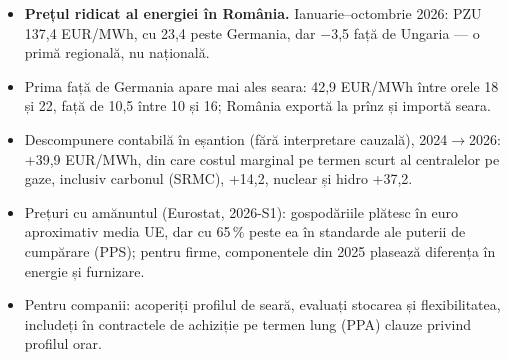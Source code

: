 \begin{itemize}\setlength{\itemsep}{2pt}
  \item \textbf{Prețul ridicat al energiei în România.} Ianuarie--octombrie 2026: PZU 137,4 EUR/MWh, cu 23,4 peste Germania, dar $-$3,5 față de Ungaria --- o primă regională, nu națională.
  \item Prima față de Germania apare mai ales seara: 42,9 EUR/MWh între orele 18 și 22, față de 10,5 între 10 și 16; România exportă la prînz și importă seara.
  \item Descompunere contabilă în eșantion (fără interpretare cauzală), 2024$\to$2026: +39,9 EUR/MWh, din care costul marginal pe termen scurt al centralelor pe gaze, inclusiv carbonul (SRMC), +14,2, nuclear și hidro +37,2.
  \item Prețuri cu amănuntul (Eurostat, 2026-S1): gospodăriile plătesc în euro aproximativ media UE, dar cu 65\,\% peste ea în standarde ale puterii de cumpărare (PPS); pentru firme, componentele din 2025 plasează diferența în energie și furnizare.
  \item Pentru companii: acoperiți profilul de seară, evaluați stocarea și flexibilitatea, includeți în contractele de achiziție pe termen lung (PPA) clauze privind profilul orar.
\end{itemize}
